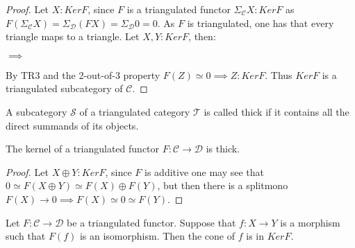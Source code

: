     \begin{proof}
        Let $X:KerF$, since $F$ is a triangulated functor $\Sigma_{\mathcal{C}}X:KerF$ as $F(\Sigma_{\mathcal{C}}X)=\Sigma_{\mathcal{D}}(FX)=\Sigma_{\mathcal{D}}0=0$. As $F$ is triangulated, one has that every triangle maps to a triangle. Let $X,Y:KerF$, then:
        \begin{center}
            $\implies$
        \end{center}
        By TR3 and the 2-out-of-3 property $F(Z)\simeq 0 \implies Z:KerF$. Thus $KerF$ is a triangulated subcategory of $\mathcal{C}$.
    \end{proof}

    \begin{definition}
        A subcategory $\mathcal{S}$ of a triangulated category $\mathcal{T}$ is called thick if it contains all the direct summands of its objects.
    \end{definition}

    \begin{lemma}
        The kernel of a triangulated functor $F:\mathcal{C}\rightarrow\mathcal{D}$ is thick.
    \end{lemma}

    \begin{proof}
        Let $X\oplus Y:KerF$, since $F$ is additive one may see that $0\simeq F(X\oplus Y)\simeq F(X)\oplus F(Y)$, but then there is a splitmono $F(X)\rightarrow 0 \implies F(X)\simeq 0 \simeq F(Y)$.
    \end{proof}

    \begin{lemma}
        Let $F:\mathcal{C}\rightarrow\mathcal{D}$ be a triangulated functor. Suppose that $f:X\rightarrow Y$ is a morphism such that $F(f)$ is an isomorphism. Then the cone of $f$ is in $KerF$.
    \end{lemma}

